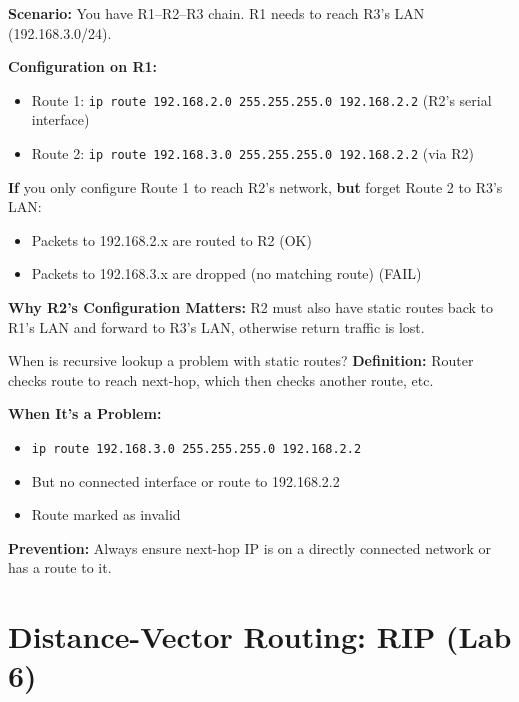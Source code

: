 \documentclass[12pt,a4paper]{article}
\begin{document}

\begin{condbox}
\textbf{Scenario:} You have R1--R2--R3 chain. R1 needs to reach R3's LAN (192.168.3.0/24).

\textbf{Configuration on R1:}
\begin{itemize}
    \item Route 1: \texttt{ip route 192.168.2.0 255.255.255.0 192.168.2.2} (R2's serial interface)
    \item Route 2: \texttt{ip route 192.168.3.0 255.255.255.0 192.168.2.2} (via R2)
\end{itemize}

\textbf{If} you only configure Route 1 to reach R2's network, \textbf{but} forget Route 2 to R3's LAN:
\begin{itemize}
    \item Packets to 192.168.2.x are routed to R2 (OK)
    \item Packets to 192.168.3.x are dropped (no matching route) (FAIL)
\end{itemize}

\textbf{Why R2's Configuration Matters:}
R2 must also have static routes back to R1's LAN and forward to R3's LAN, otherwise return traffic is lost.
\end{condbox}


\begin{whenwhybox}{When is recursive lookup a problem with static routes?}
\textbf{Definition:} Router checks route to reach next-hop, which then checks another route, etc.

\textbf{When It's a Problem:}
\begin{itemize}
    \item \texttt{ip route 192.168.3.0 255.255.255.0 192.168.2.2}
    \item But no connected interface or route to 192.168.2.2
    \item Route marked as invalid
\end{itemize}

\textbf{Prevention:} Always ensure next-hop IP is on a directly connected network or has a route to it.
\end{whenwhybox}

\section{Distance-Vector Routing: RIP (Lab 6)}
\end{document}
